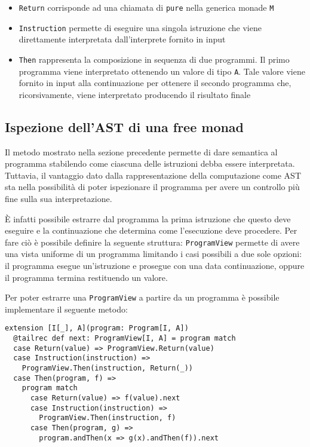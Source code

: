 \begin{itemize}
  \item \lstinline{Return} corrisponde ad una chiamata di \lstinline{pure} nella generica monade \lstinline{M}
  \item \lstinline{Instruction} permette di eseguire una singola istruzione che viene direttamente interpretata dall'interprete fornito in input
  \item \lstinline{Then} rappresenta la composizione in sequenza di due programmi. Il primo programma viene interpretato ottenendo un valore di tipo \lstinline{A}. Tale valore viene fornito in input alla continuazione per ottenere il secondo programma che, ricorsivamente, viene interpretato producendo il risultato finale
\end{itemize}

\subsection{Ispezione dell'AST di una free monad}
Il metodo mostrato nella sezione precedente permette di dare semantica al programma stabilendo come ciascuna delle istruzioni debba essere interpretata.
Tuttavia, il vantaggio dato dalla rappresentazione della computazione come \ac{AST} sta nella possibilità di poter ispezionare il programma per avere un controllo più fine sulla sua interpretazione.

È infatti possibile estrarre dal programma la prima istruzione che questo deve eseguire e la continuazione che determina come l'esecuzione deve procedere. Per fare ciò è possibile definire la seguente struttura:
\lstinline{ProgramView} permette di avere una vista uniforme di un programma limitando i casi possibili a due sole opzioni: il programma esegue un'istruzione e prosegue con una data continuazione, oppure il programma termina restituendo un valore.

Per poter estrarre una \lstinline{ProgramView} a partire da un programma è possibile implementare il seguente metodo:
\begin{lstlisting}[language=scala3]
extension [I[_], A](program: Program[I, A])
  @tailrec def next: ProgramView[I, A] = program match
  case Return(value) => ProgramView.Return(value)
  case Instruction(instruction) =>
    ProgramView.Then(instruction, Return(_))
  case Then(program, f) =>
    program match
      case Return(value) => f(value).next
      case Instruction(instruction) =>
        ProgramView.Then(instruction, f)
      case Then(program, g) =>
        program.andThen(x => g(x).andThen(f)).next
\end{lstlisting}

